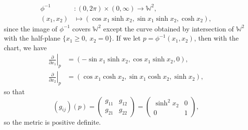 \documentclass[letter-paper]{tufte-book}
\newenvironment{example}[1][Example]{\begin{trivlist}
\item[\hskip \labelsep {\bfseries #1}]}{\end{trivlist}}
\begin{document}
\begin{example}
\begin{enumerate}
    \begin{align*}
      \phi^{-1} &: (0, 2\pi) \times (0,\infty) \to \mathbb{W}^2,\\
      (x_1, x_2) &\mapsto (\cos x_1 \sinh x_2, \sin x_1 \sinh x_2, \cosh x_2),
    \end{align*}
    since the image of $\phi^{-1}$ covers $\mathbb{W}^2$ except the curve obtained by intersection of $\mathbb{W}^2$ with the half-plane $\{x_1 \geq 0,\ x_2 = 0\}$. If we let $p = \phi^{-1}(x_1, x_2)$, then with the chart, we have
    \begin{align*}
      \left.\frac{\partial}{\partial x_1}\right|_p &= (-\sin x_1 \sinh x_2, \cos x_1 \sinh x_2, 0), \\
      \left.\frac{\partial}{\partial x_2}\right|_p &= (\cos x_1 \cosh x_2, \sin x_1 \cosh x_2, \sinh x_2),
    \end{align*}
    so that
    \begin{equation*}
      (g_{ij})(p) = \begin{pmatrix} g_{11} & g_{12} \\ g_{21} & g_{22} \end{pmatrix} = \begin{pmatrix} \sinh^2 x_2 & 0 \\ 0 & 1 \end{pmatrix},
    \end{equation*}
    so the metric is positive definite.
    

\end{enumerate}
\end{example}
\end{document}
